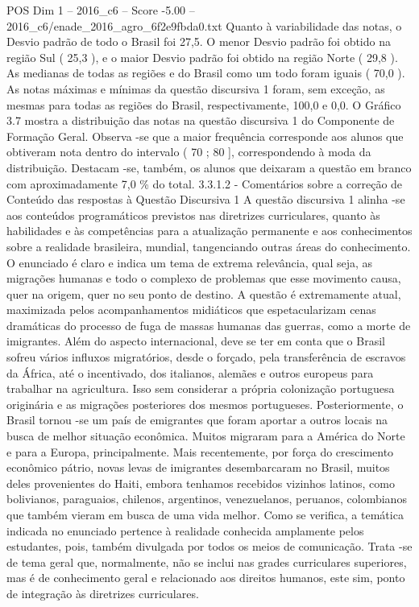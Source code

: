 \begin{textsample}{POS Dim 1 – 2016\_c6 – Score -5.00 – 2016\_c6/enade\_2016\_agro\_6f2e9fbda0.txt}
Quanto à variabilidade das notas, o Desvio padrão de todo o Brasil foi 27,5.
O menor Desvio padrão foi obtido na região Sul ( 25,3 ), e o maior Desvio padrão foi obtido na região Norte ( 29,8 ).
As medianas de todas as regiões e do Brasil como um todo foram iguais ( 70,0 ).
As notas máximas e mínimas da questão discursiva 1 foram, sem exceção, as mesmas para todas as regiões do Brasil, respectivamente, 100,0 e 0,0.
O Gráfico 3.7 mostra a distribuição das notas na questão discursiva 1 do Componente de Formação Geral.
Observa -se que a maior frequência corresponde aos alunos que obtiveram nota dentro do intervalo ( 70 ; 80 ], correspondendo à moda da distribuição.
Destacam -se, também, os alunos que deixaram a questão em branco com aproximadamente 7,0 \% do total. 3.3.1.2 - Comentários sobre a correção de Conteúdo das respostas à Questão Discursiva 1 A questão discursiva 1 alinha -se aos conteúdos programáticos previstos nas diretrizes curriculares, quanto às habilidades e às competências para a atualização permanente e aos conhecimentos sobre a realidade brasileira, mundial, tangenciando outras áreas do conhecimento.
O enunciado é claro e indica um tema de extrema relevância, qual seja, as migrações humanas e todo o complexo de problemas que esse movimento causa, quer na origem, quer no seu ponto de destino.
A questão é extremamente atual, maximizada pelos acompanhamentos midiáticos que espetacularizam cenas dramáticas do processo de fuga de massas humanas das guerras, como a morte de imigrantes.
Além do aspecto internacional, deve se ter em conta que o Brasil sofreu vários influxos migratórios, desde o forçado, pela transferência de escravos da África, até o incentivado, dos italianos, alemães e outros europeus para trabalhar na agricultura.
Isso sem considerar a própria colonização portuguesa originária e as migrações posteriores dos mesmos portugueses.
Posteriormente, o Brasil tornou -se um país de emigrantes que foram aportar a outros locais na busca de melhor situação econômica.
Muitos migraram para a América do Norte e para a Europa, principalmente.
Mais recentemente, por força do crescimento econômico pátrio, novas levas de imigrantes desembarcaram no Brasil, muitos deles provenientes do Haiti, embora tenhamos recebidos vizinhos latinos, como bolivianos, paraguaios, chilenos, argentinos, venezuelanos, peruanos, colombianos que também vieram em busca de uma vida melhor.
Como se verifica, a temática indicada no enunciado pertence à realidade conhecida amplamente pelos estudantes, pois, também divulgada por todos os meios de comunicação.
Trata -se de tema geral que, normalmente, não se inclui nas grades curriculares superiores, mas é de conhecimento geral e relacionado aos direitos humanos, este sim, ponto de integração às diretrizes curriculares.

\end{textsample}
